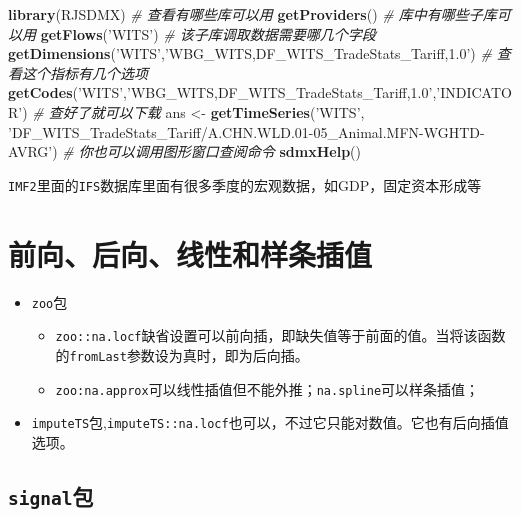 \documentclass[
]{book}
\newenvironment{Shaded}{\begin{snugshade}}{\end{snugshade}}
\newcommand{\CommentTok}[1]{\textcolor[rgb]{0.56,0.35,0.01}{\textit{#1}}}
\newcommand{\KeywordTok}[1]{\textcolor[rgb]{0.13,0.29,0.53}{\textbf{#1}}}
\newcommand{\NormalTok}[1]{#1}
\newcommand{\StringTok}[1]{\textcolor[rgb]{0.31,0.60,0.02}{#1}}
\providecommand{\tightlist}{%
  \setlength{\itemsep}{0pt}\setlength{\parskip}{0pt}}
\begin{document}
\begin{Shaded}
\begin{Highlighting}[]
\KeywordTok{library}\NormalTok{(RJSDMX)}
\CommentTok{# 查看有哪些库可以用}
\KeywordTok{getProviders}\NormalTok{()}
\CommentTok{# 库中有哪些子库可以用}
\KeywordTok{getFlows}\NormalTok{(}\StringTok{'WITS'}\NormalTok{)}
\CommentTok{# 该子库调取数据需要哪几个字段}
\KeywordTok{getDimensions}\NormalTok{(}\StringTok{'WITS'}\NormalTok{,}\StringTok{'WBG_WITS,DF_WITS_TradeStats_Tariff,1.0'}\NormalTok{)}
\CommentTok{# 查看这个指标有几个选项 }
\KeywordTok{getCodes}\NormalTok{(}\StringTok{'WITS'}\NormalTok{,}\StringTok{'WBG_WITS,DF_WITS_TradeStats_Tariff,1.0'}\NormalTok{,}\StringTok{'INDICATOR'}\NormalTok{)}
\CommentTok{# 查好了就可以下载}
\NormalTok{ans <-}\StringTok{ }\KeywordTok{getTimeSeries}\NormalTok{(}\StringTok{'WITS'}\NormalTok{, }\StringTok{'DF_WITS_TradeStats_Tariff/A.CHN.WLD.01-05_Animal.MFN-WGHTD-AVRG'}\NormalTok{)}
\CommentTok{# 你也可以调用图形窗口查阅命令}
\KeywordTok{sdmxHelp}\NormalTok{()}
\end{Highlighting}
\end{Shaded}

\texttt{IMF2}里面的\texttt{IFS}数据库里面有很多季度的宏观数据，如GDP，固定资本形成等

\hypertarget{ux524dux5411ux540eux5411ux7ebfux6027ux548cux6837ux6761ux63d2ux503c}{%
\section{前向、后向、线性和样条插值}\label{ux524dux5411ux540eux5411ux7ebfux6027ux548cux6837ux6761ux63d2ux503c}}

\begin{itemize}
\tightlist
\item
  \texttt{zoo}包

  \begin{itemize}
  \tightlist
  \item
    \texttt{zoo::na.locf}缺省设置可以前向插，即缺失值等于前面的值。当将该函数的\texttt{fromLast}参数设为真时，即为后向插。
  \item
    \texttt{zoo:na.approx}可以线性插值但不能外推；\texttt{na.spline}可以样条插值；
  \end{itemize}
\item
  \texttt{imputeTS}包,\texttt{imputeTS::na.locf}也可以，不过它只能对数值。它也有后向插值选项。
\end{itemize}

\hypertarget{signalux5305}{%
\subsection{\texorpdfstring{\texttt{signal}包}{signal包}}\label{signalux5305}}
\end{document}
